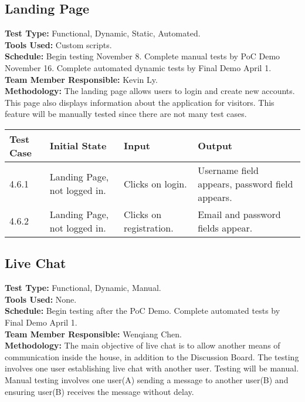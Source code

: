 \documentclass[12pt]{article}
\begin{document}
\subsection{Landing Page}
\textbf{Test Type:} Functional, Dynamic, Static, Automated. \\
\textbf{Tools Used:} Custom scripts. \\
\textbf{Schedule:} Begin testing November 8. Complete manual tests by PoC Demo November 16. Complete automated dynamic tests by Final Demo April 1. \\
\textbf{Team Member Responsible:} Kevin Ly.\\
\textbf{Methodology:} The landing page allows users to login and create new accounts. This page also displays information about the application for visitors. This feature will be manually tested since there are not many test cases.

\begin{longtable}{|p{2cm}|p{3cm}|p{5cm}|p{5cm}|}
\hline
\textbf{Test Case}  & \textbf{Initial State} & \textbf{Input} & \textbf{Output} \\ \hline
4.6.1 & Landing Page, not logged in. & Clicks on login. & Username field appears, password field appears.\\
\hline
4.6.2 & Landing Page, not logged in. & Clicks on registration. & Email and password fields appear.\\
\hline
\end{longtable}


\subsection{Live Chat}
\textbf{Test Type:} Functional, Dynamic, Manual. \\
\textbf{Tools Used:} None. \\
\textbf{Schedule:} Begin testing after the PoC Demo. Complete automated tests by Final Demo April 1. \\
\textbf{Team Member Responsible:} Wenqiang Chen.\\
\textbf{Methodology:} The main objective of live chat is to allow another means of communication inside the house, in addition to the Discussion Board. The testing involves one user establishing live chat with another user. Testing will be manual. Manual testing involves one user(A) sending a message to another user(B) and ensuring user(B) receives the message without delay. 
\end{document}
